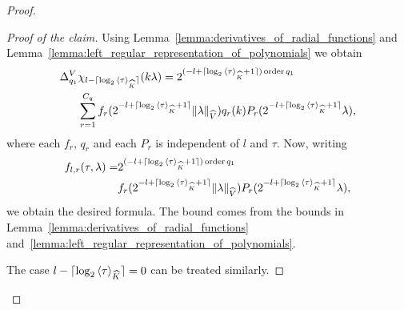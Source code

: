 \begin{proof}
\begin{description}
\begin{proof}[Proof of the claim]
                Using Lemma~\ref{lemma:derivatives_of_radial_functions} and Lemma~\ref{lemma:left_regular_representation_of_polynomials}
                we obtain
                \begin{align*}
                    \DifferenceOperator[\VectorSpace]{q_1} &\chi_{l - \Ceiling{\log_2 \JapaneseBracket{\CompactGroup}{\tau}}}(k \lambda) =
                    2^{(-l + \Ceiling{\log_2 \JapaneseBracket{\CompactGroup}{\tau} + 1}) \order{q_1}}\\
                    &\sum_{r = 1}^{C_q} f_r(2^{-l + \Ceiling{\log_2 \JapaneseBracket{\CompactGroup}{\tau} + 1}} \norm[\dualGroup{\VectorSpace}]{\lambda}) q_r(k) P_r(2^{-l + \Ceiling{\log_2 \JapaneseBracket{\CompactGroup}{\tau} + 1}} \lambda),
                \end{align*}
                where each $f_r$, $q_r$ and each $P_r$ is independent of $l$ and $\tau$.
                Now, writing
                \begin{align*}
                    f_{l, r}(\tau, \lambda) =
                    &2^{(-l + \Ceiling{\log_2 \JapaneseBracket{\CompactGroup}{\tau} + 1}) \order{q_1}}\\
                    &f_r(2^{-l + \Ceiling{\log_2 \JapaneseBracket{\CompactGroup}{\tau} + 1}} \norm[\dualGroup{\VectorSpace}]{\lambda}) P_r(2^{-l + \Ceiling{\log_2 \JapaneseBracket{\CompactGroup}{\tau} + 1}} \lambda),
                \end{align*}
                we obtain the desired formula.
                The bound comes from the bounds in Lemma~\ref{lemma:derivatives_of_radial_functions} and~\ref{lemma:left_regular_representation_of_polynomials}.

                The case $l - \Ceiling{\log_2 \JapaneseBracket{\CompactGroup}{\tau}} = 0$ can be treated similarly.
            \end{proof}


\end{description}
\end{proof}
